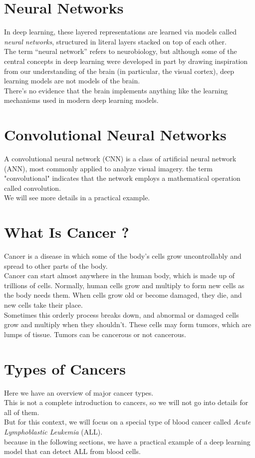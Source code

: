 \documentclass{SBCbookchapter}
\begin{document}
\section*{Neural Networks}
In deep learning, these layered representations 
are learned via models called \textit{neural networks}, 
structured in literal layers stacked on top of each other. \\
The term “neural network” refers to neurobiology, 
but although some of the central concepts in deep 
learning  were  developed  in  part  by  drawing  
inspiration  from  our  understanding  of the  
brain  (in  particular,  the  visual  cortex),  
deep  learning  models  are  not  models  of 
the brain. \\
There’s no evidence that the brain implements 
anything like the learning mechanisms used in 
modern deep learning models.

\section*{Convolutional Neural Networks}
A convolutional neural network
(CNN) is a class of artificial neural
network (ANN), most commonly
applied to analyze visual imagery.
the term "convolutional" indicates
that the network employs a
mathematical operation called
convolution. \\
We will see more details in a practical example.

\section*{What Is Cancer ?}
Cancer is a disease in which some of the body’s 
cells grow uncontrollably and spread to other parts of the body. \\ 
Cancer can start almost anywhere in the human body, 
which is made up of trillions of cells. Normally, 
human cells grow and multiply to form new cells as the 
body needs them. When cells grow old or become 
damaged, they die, and new cells take their place. \\
Sometimes this orderly process breaks down, and
abnormal or damaged cells grow and multiply when
they shouldn’t. These cells may form tumors, which
are lumps of tissue. Tumors can be cancerous or
not cancerous. 

\section*{Types of Cancers}
Here we have an overview of major cancer types. \\
This is not a complete introduction to cancers, 
so we will not go into details for all of them. \\
But for this context, we will focus on a special type of blood cancer
called \textit{Acute Lymphoblastic Leukemia} (ALL). \\
because in the following sections, we have a practical example
of a deep learning model that can detect ALL from blood cells.
\end{document}
